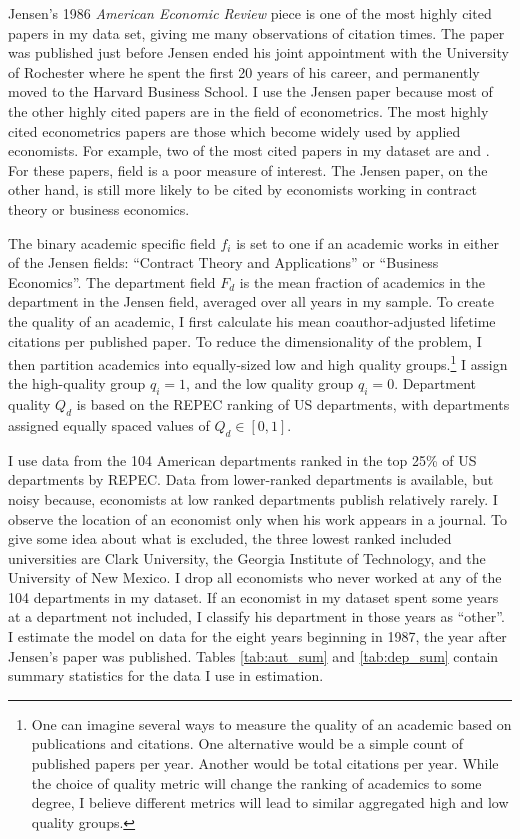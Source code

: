 Jensen's 1986 \emph{American Economic Review} piece is one of the most highly
cited papers in my data set, giving me many observations of citation
times. The paper was published just before Jensen ended his joint
appointment with the University of Rochester where he spent the first 20
years of his career, and permanently moved to the Harvard Business
School. I use the Jensen paper because most of the other highly cited papers 
are in the field of econometrics. The most highly cited econometrics papers are those 
which become widely used by applied economists.  For example, two of the most cited
papers in my dataset are \citet{heckman1979sample} and \citet{white1980heteroskedasticity}.
 For these papers, field is a poor measure of interest.  The Jensen paper, on the
 other hand, is still more likely to be cited by economists working in contract theory or business
economics.

The binary academic specific
field $f_i$ is set to one if an academic works in
either of the Jensen fields: ``Contract Theory and Applications'' or ``Business Economics''.
The department field $F_d$ is the mean fraction of academics in the department in the 
Jensen field, averaged over all years in my sample.  To create the quality of an academic, I
first calculate his mean coauthor-adjusted lifetime citations per published paper. To reduce the
dimensionality of the problem, I then partition academics into equally-sized
low and high quality groups.\footnote{One can imagine
several ways to measure the quality of an academic based on publications and citations.
One alternative would be a simple count of published papers per year.  Another would be
total citations per year.  While the choice of quality metric will change the
ranking of academics to some degree, I believe different metrics will lead to
similar aggregated high and low quality groups.}  I assign the high-quality group $q_i = 1$, 
and the low quality group $q_i = 0$.  Department quality $Q_d$ is based on the REPEC ranking
of US departments, with departments assigned equally spaced values of $Q_d \in [0,1]$.

I use data from the 104 American departments ranked in the top 25\% of
US departments by REPEC. Data from lower-ranked departments is
available, but noisy because, economists at low ranked departments
publish relatively rarely. I observe the location of an economist
only when his work appears in a journal. To give some idea about what is
excluded, the three lowest ranked included universities are Clark
University, the Georgia Institute of Technology, and the University of
New Mexico. I drop all economists who never worked at any of the 104 departments 
in my dataset.  If an economist in my dataset spent some years at a
department not included, I classify his department in those years as
``other''. I estimate the model on data for the eight years beginning
in 1987, the year after Jensen's paper was published. Tables \ref{tab:aut_sum}
and \ref{tab:dep_sum} contain summary statistics for the data I use in
estimation.

